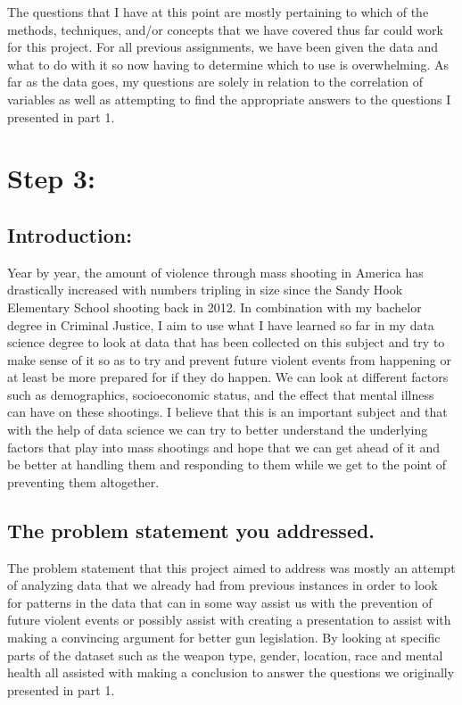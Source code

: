 \documentclass[
]{article}
\begin{document}
The questions that I have at this point are mostly pertaining to which
of the methods, techniques, and/or concepts that we have covered thus
far could work for this project. For all previous assignments, we have
been given the data and what to do with it so now having to determine
which to use is overwhelming. As far as the data goes, my questions are
solely in relation to the correlation of variables as well as attempting
to find the appropriate answers to the questions I presented in part 1.

\section{Step 3:}\label{step-3}

\subsection{Introduction:}\label{introduction-1}

Year by year, the amount of violence through mass shooting in America
has drastically increased with numbers tripling in size since the Sandy
Hook Elementary School shooting back in 2012. In combination with my
bachelor degree in Criminal Justice, I aim to use what I have learned so
far in my data science degree to look at data that has been collected on
this subject and try to make sense of it so as to try and prevent future
violent events from happening or at least be more prepared for if they
do happen. We can look at different factors such as demographics,
socioeconomic status, and the effect that mental illness can have on
these shootings. I believe that this is an important subject and that
with the help of data science we can try to better understand the
underlying factors that play into mass shootings and hope that we can
get ahead of it and be better at handling them and responding to them
while we get to the point of preventing them altogether.

\subsection{The problem statement you
addressed.}\label{the-problem-statement-you-addressed.}

The problem statement that this project aimed to address was mostly an
attempt of analyzing data that we already had from previous instances in
order to look for patterns in the data that can in some way assist us
with the prevention of future violent events or possibly assist with
creating a presentation to assist with making a convincing argument for
better gun legislation. By looking at specific parts of the dataset such
as the weapon type, gender, location, race and mental health all
assisted with making a conclusion to answer the questions we originally
presented in part 1.
\end{document}
